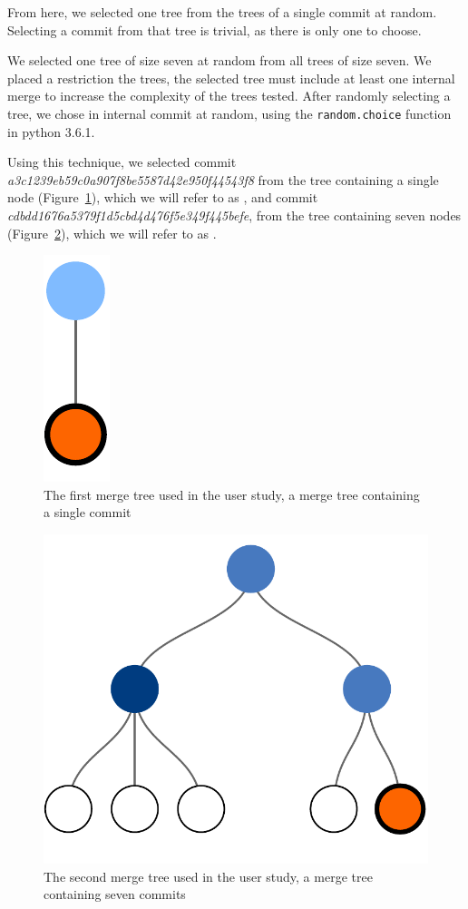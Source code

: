 From here, we selected one tree from the trees of a single commit at
random. Selecting a commit from that tree is trivial, as there is only
one to choose.

We selected one tree of size seven at random from all trees of size
seven. We placed a restriction the trees, the selected tree must include
at least one internal merge to increase the complexity of the trees
tested. After randomly selecting a tree, we chose in internal commit at
random, using the \verb|random.choice| function in python 3.6.1.


Using this technique, we selected commit
\emph{a3c1239eb59c0a907f8be5587d42e950f44543f8} from the tree containing
a single node (Figure~\ref{fig:commit_1}), which we will refer to as
\comA, and commit \emph{cdbdd1676a5379f1d5cbd4d476f5e349f445befe}, from
the tree containing seven nodes (Figure~\ref{fig:commit_2}), which we
will refer to as \comB.

\begin{figure}[bpt]
  \centering
  \includegraphics[width=0.08\linewidth]{figures/commits/1-commit.pdf}
  \caption{The first merge tree used in the user study, a merge tree
    containing a single commit}
  \label{fig:commit_1}
\end{figure}

\begin{figure}[bpt]
  \centering
  \includegraphics[width=0.5\linewidth]{figures/commits/7-commits.pdf}
  \caption{The second merge tree used in the user study, a merge tree
    containing seven commits}
  \label{fig:commit_2}
\end{figure}



